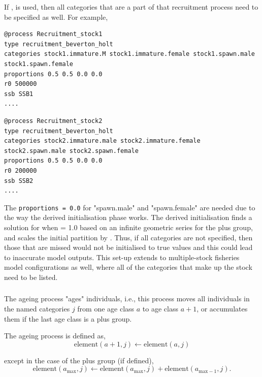 If ,  is used, then all categories that are a part of that recruitment process need to be specified as well. For example,

{\small{\begin{verbatim}
@process Recruitment_stock1
type recruitment_beverton_holt
categories stock1.immature.M stock1.immature.female stock1.spawn.male stock1.spawn.female
proportions 0.5 0.5 0.0 0.0
r0 500000
ssb SSB1
....
\end{verbatim}}}

{\small{\begin{verbatim}
@process Recruitment_stock2
type recruitment_beverton_holt
categories stock2.immature.male stock2.immature.female stock2.spawn.male stock2.spawn.female
proportions 0.5 0.5 0.0 0.0
r0 200000
ssb SSB2
....
\end{verbatim}}}

The \texttt{proportions = 0.0} for "spawn.male" and "spawn.female" are needed due to the way the derived initialisation phase works. The derived initialisation finds a solution for when  = 1.0 based on an infinite geometric series for the plus group, and scales the initial partition by . Thus, if all categories are not specified, then those that are missed would not be initialised to true values and this could lead to inaccurate model outputs. This set-up extends to multiple-stock fisheries model configurations as well, where all of the categories that make up the stock need to be listed.

\subsubsection{\label{sec:Process-Ageing}}

The ageing process "ages" individuals, i.e., this process moves all individuals in the named categories $j$ from one age class $a$ to age class $a + 1$, or accumulates them if the last age class is a plus group.

The ageing process is defined as,
\begin{equation}
  \text{element}(a + 1,j) \leftarrow \text{element}(a,j)
\end{equation}

except in the case of the plus group (if defined),
\begin{equation}
  \text{element}(a_{\text{max}}, j) \leftarrow \text{element}(a_{\text{max}}, j) + \text{element}(a_{\text{max}-1}, j).
\end{equation}

